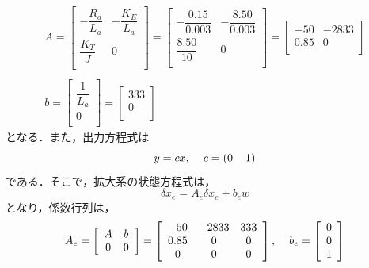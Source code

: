 \documentclass[a4paper,12pt]{jarticle}
\begin{document}
\begin{equation}
\begin{array}{c}
 A =
 \left[
  \begin{array}{cc}
   - \dfrac{R_a}{L_a} & - \dfrac{K_E}{L_a} \\
   \dfrac{K_T}{J } & 0 \\
  \end{array}
 \right]
 =
 \left[
  \begin{array}{cc}
   - \dfrac{0.15}{0.003} & -\dfrac{8.50}{0.003} \\
   \dfrac{8.50}{10} & 0 \\
  \end{array}
 \right]
 =
 \left[
  \begin{array}{cc}
   -50 & -2833 \\
   0.85 & 0 \\
  \end{array}
 \right]
\\\\
 b =
 \left[
  \begin{array}{c}
   \dfrac{1}{L_a} \\
   0 \\
  \end{array}
 \right]
 =
 \left[
  \begin{array}{c}
   333 \\
   0 \\
  \end{array}
 \right]
\end{array}
\end{equation}
%
となる．また，出力方程式は
%
\begin{equation}
 y = cx , \hspace{4mm} c = ( 0 \hspace{4mm} 1)
\end{equation}
%
である．そこで，拡大系の状態方程式は，
%
\begin{equation}
 \delta \dot{x}_e = A_e \delta x_e + b_e w
\end{equation}
%
となり，係数行列は，
%
\begin{equation}
 A_e =
 \left[
  \begin{array}{cc}
   A & b \\
   0 & 0 \\
  \end{array}
 \right]
 =
 \left[
  \begin{array}{ccc}
   - 50 & -2833 & 333 \\
   0.85 & 0 & 0 \\
   0 & 0 & 0 \\
  \end{array}
 \right] , \hspace{4mm} b_e =
 \left[
  \begin{array}{c}
   0 \\
   0 \\
   1 \\
  \end{array}
 \right]
\end{equation}
\end{document}
